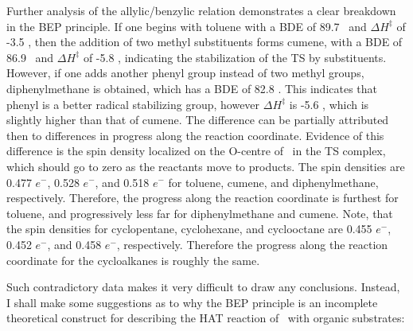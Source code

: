 Further analysis of the allylic/benzylic relation demonstrates a clear
breakdown in the BEP principle. If one begins with toluene with a BDE of 89.7
\kcalmol\ and $\Delta H^\ddagger$ of -3.5 \kcalmol, then the addition of two
methyl substituents forms cumene, with a BDE of 86.9 \kcalmol\ and $\Delta
H^\ddagger$ of -5.8 \kcalmol, indicating the stabilization of the TS by
substituents. However, if one adds another phenyl group instead of two methyl
groups, diphenylmethane is obtained, which has a BDE of 82.8 \kcalmol. This
indicates that phenyl is a better radical stabilizing group, however $\Delta
H^\ddagger$ is -5.6 \kcalmol, which is slightly higher than that of cumene. The
difference can be partially attributed then to differences in progress along
the reaction coordinate. Evidence of this difference is the spin density
localized on the O-centre of \cumo\ in the TS complex, which should go to zero
as the reactants move to products. The  spin densities are 0.477 $e^-$,
0.528 $e^-$, and 0.518 $e^-$ for toluene, cumene, and diphenylmethane,
respectively. Therefore, the progress along the reaction coordinate is furthest
for toluene, and progressively less far for diphenylmethane and cumene. Note,
that the  spin densities for cyclopentane, cyclohexane, and cyclooctane
are 0.455 $e^-$, 0.452 $e^-$, and 0.458 $e^-$, respectively. Therefore the
progress along the reaction coordinate for the cycloalkanes is roughly the
same.

Such contradictory data makes it very difficult to draw any conclusions.
Instead, I shall make some suggestions as to why the BEP principle is an
incomplete theoretical construct for describing the HAT reaction of \cumo\ with
organic substrates:

